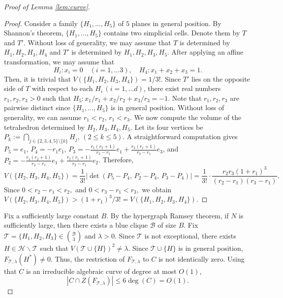 \documentclass[a4paper,oneside,10pt]{amsart}
\begin{document}
\begin{proof}[Proof of Lemma \ref{lem:curve}]
\begin{proof}
Consider a family $\{H_1, \ldots, H_5 \}$ of $5$ planes in general position. By Shannon's theorem, $\{H_1, \ldots, H_5 \}$ contains two simplicial cells. Denote them by $T$ and $T'$. Without loss of generality, we may assume that $T$ is determined by $H_1, H_2, H_3, H_4$ and $T'$ is determined by $H_1,H_2, H_3, H_5$. After applying an affine transformation, we may assume that
$$
H_i : x_i = 0  \quad (i = 1, \ldots 3), \quad H_{4} : x_1 + x_2 + x_3 = 1.
$$
Then, it is trivial that $V(\{H_1,H_2,H_3,H_4\}) = 1/3!$.
Since $T'$ lies on the opposite side of $T$ with respect to each $H_i \, (i=1, \ldots d)$, there exist real numbers $r_1, r_2, r_3 > 0$ such that
$H_5 : x_1/r_1 + x_2/r_2 + x_3/r_3 = -1$.
Note that $r_1, r_2, r_3$ are pairwise distinct since $\{H_1, \ldots, H_5 \}$ is in general position.
Without loss of generality, we can assume 
$
r_1<r_2,\,r_1<r_3.
$
We now compute the volume of the tetrahedron determined by $H_2,H_3,H_4,H_5$.
Let its four vertices be
$
P_k
:=
\bigcap_{j\in\{2,3,4,5\}\setminus\{k\}} H_j,
\, (2 \leq k \leq 5).
$
A straightforward computation gives
$P_5 = e_1$, $P_4=-r_1e_1$, $P_3=-\frac{r_1(r_3+1)}{r_3-r_1}e_1 + \frac{r_3(r_1+1)}{r_3-r_1}e_3$,
and
$P_2=-\frac{r_1(r_2+1)}{r_2-r_1}e_1 + \frac{r_2(r_1+1)}{r_2-r_1}e_2$.
Therefore,
$$
V(\{H_2,H_3,H_4,H_5\}) =
\frac{1}{3!}
\left|
\det
\left(
P_5-P_4,\,
P_2-P_4,\,
P_3-P_4
\right)
\right| 
=
\frac{1}{3!} \cdot
\frac{
r_2r_3(1+r_1)^3
}{
(r_2-r_1)(r_3-r_1)
}.
$$
Since
$
0<r_2-r_1<r_2,
$
and
$
0<r_3-r_1<r_3,
$
we obtain
$
V(\{H_2,H_3,H_4,H_5\}) > (1+r_1)^3/3! = V(\{H_1,H_2,H_3,H_4\}).
$
\end{proof}

Fix a sufficiently large constant $B$. By the hypergraph Ramsey theorem, if $N$ is sufficiently large, then there exists a blue clique $\mathcal{B}$ of size $B$.
Fix $\mathcal{T} = \{ H_1, H_2, H_3 \} \in \binom{\mathcal{B}}{3}$ and $\lambda > 0$. 
Since $\mathcal{T}$ is not exceptional, there exists $H \in \mathcal{H} \backslash \mathcal{T}$ such that $V (\mathcal{T} \cup \{H \})^2 \neq \lambda$. Since $\mathcal{T} \cup \{ H \}$ is in general position, $F_{\mathcal{T}, \lambda}(H^{*}) \neq 0$.
Thus, the restriction of $F_{\mathcal{T}, \lambda}$ to $C$ is not identically zero. Using that $C$ is an irreducible algebraic curve of degree at most $O(1)$,
$$
|C \cap Z (F_{\mathcal{T}, \lambda})| \leq 6 \deg (C) = O(1).
$$


\end{proof}
\end{document}
